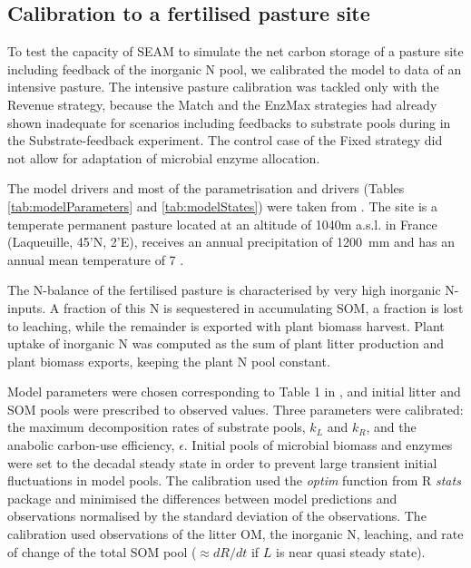 \subsection{Calibration to a fertilised pasture site}
\label{sec:methodsPasture}

To test the capacity of SEAM to simulate the net carbon storage of a pasture
site including feedback of the inorganic N pool, we calibrated the model to data
of an intensive pasture. The intensive pasture calibration was tackled only with
the Revenue strategy, because the Match and the EnzMax strategies had already
shown inadequate for scenarios including feedbacks to substrate pools during
in the Substrate-feedback experiment. The control case of the Fixed
strategy did not allow for adaptation of microbial enzyme allocation.

The model drivers and most of the parametrisation and drivers (Tables
\ref{tab:modelParameters} and \ref{tab:modelStates}) were taken from
\citet{Perveen14}.
The site is a temperate permanent pasture located at an altitude of 1040m
a.s.l. in France (Laqueuille, 45'N, 2'E), receives
an annual precipitation of 1200~mm and has an annual mean temperature of  7
.

The N-balance of the fertilised pasture is characterised by very high inorganic
N-inputs. A fraction of this N is sequestered in accumulating SOM, a fraction is
lost to leaching, while the remainder is exported with plant biomass harvest.
Plant uptake of inorganic N was computed as the sum of plant litter production
and plant biomass exports, keeping the plant N pool constant.
 
Model parameters were chosen corresponding to Table 1 in \citet{Perveen14}, and
initial litter and SOM pools were prescribed to observed values.
Three parameters were calibrated: the maximum decomposition rates
of substrate pools, $k_L$ and $k_R$, and the anabolic carbon-use efficiency,
$\epsilon$. Initial pools of microbial biomass and enzymes were set to the
decadal steady state in order to prevent large transient initial
fluctuations in model pools. The calibration used the \textit{optim} function
from R \textit{stats} package \citep{R07} and minimised the differences between model
predictions and observations normalised by the standard deviation of the
observations. The calibration used observations of the litter OM, the inorganic
N, leaching, and rate of change of the total SOM pool ($\approx dR/dt$ if $L$ is
near quasi steady state). 

